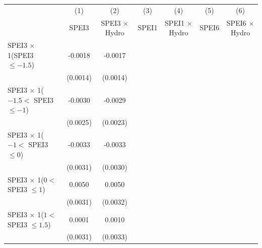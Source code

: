 {
\def\sym#1{\ifmmode^{#1}\else\(^{#1}\)\fi}
\begin{tabular}{l*{6}{c}}
\toprule
                    &\multicolumn{1}{c}{(1)}&\multicolumn{1}{c}{(2)}&\multicolumn{1}{c}{(3)}&\multicolumn{1}{c}{(4)}&\multicolumn{1}{c}{(5)}&\multicolumn{1}{c}{(6)}\\
                    &\multicolumn{1}{c}{SPEI3}&\multicolumn{1}{c}{SPEI3 $\times$ Hydro}&\multicolumn{1}{c}{SPEI1}&\multicolumn{1}{c}{SPEI1 $\times$ Hydro}&\multicolumn{1}{c}{SPEI6}&\multicolumn{1}{c}{SPEI6 $\times$ Hydro}\\
\midrule
SPEI3 $\times$ 1(SPEI3 $\leq -1.5$)&     -0.0018         &     -0.0017         &                     &                     &                     &                     \\
                    &    (0.0014)         &    (0.0014)         &                     &                     &                     &                     \\
\addlinespace
SPEI3 $\times$ 1($-1.5 <$ SPEI3 $\leq -1$)&     -0.0030         &     -0.0029         &                     &                     &                     &                     \\
                    &    (0.0025)         &    (0.0023)         &                     &                     &                     &                     \\
\addlinespace
SPEI3 $\times$ 1($-1 <$ SPEI3 $\leq 0$)&     -0.0033         &     -0.0033         &                     &                     &                     &                     \\
                    &    (0.0031)         &    (0.0030)         &                     &                     &                     &                     \\
\addlinespace
SPEI3 $\times$ 1($0 <$ SPEI3 $\leq 1$)&      0.0050         &      0.0050         &                     &                     &                     &                     \\
                    &    (0.0031)         &    (0.0032)         &                     &                     &                     &                     \\
\addlinespace
SPEI3 $\times$ 1($1 <$ SPEI3 $\leq 1.5$)&      0.0001         &      0.0010         &                     &                     &                     &                     \\
                    &    (0.0031)         &    (0.0033)         &                     &                     &                     &                     \\

\end{tabular}}
